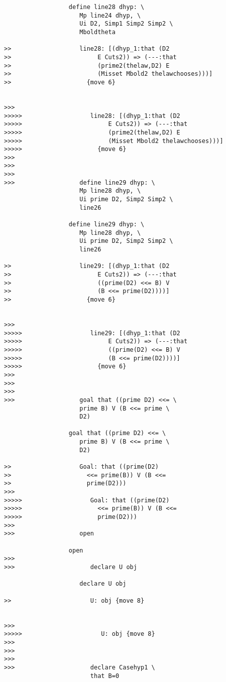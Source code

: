\documentclass[12pt]{article}
\begin{document}
\begin{verbatim}
                  define line28 dhyp: \
                     Mp line24 dhyp, \
                     Ui D2, Simp1 Simp2 Simp2 \
                     Mboldtheta

>>                   line28: [(dhyp_1:that (D2
>>                        E Cuts2)) => (---:that
>>                        (prime2(thelaw,D2) E
>>                        (Misset Mbold2 thelawchooses)))]
>>                     {move 6}


>>>
>>>>>                   line28: [(dhyp_1:that (D2
>>>>>                        E Cuts2)) => (---:that
>>>>>                        (prime2(thelaw,D2) E
>>>>>                        (Misset Mbold2 thelawchooses)))]
>>>>>                     {move 6}
>>>
>>>
>>>
>>>                  define line29 dhyp: \
                     Mp line28 dhyp, \
                     Ui prime D2, Simp2 Simp2 \
                     line26

                  define line29 dhyp: \
                     Mp line28 dhyp, \
                     Ui prime D2, Simp2 Simp2 \
                     line26

>>                   line29: [(dhyp_1:that (D2
>>                        E Cuts2)) => (---:that
>>                        ((prime(D2) <<= B) V
>>                        (B <<= prime(D2))))]
>>                     {move 6}


>>>
>>>>>                   line29: [(dhyp_1:that (D2
>>>>>                        E Cuts2)) => (---:that
>>>>>                        ((prime(D2) <<= B) V
>>>>>                        (B <<= prime(D2))))]
>>>>>                     {move 6}
>>>
>>>
>>>
>>>                  goal that ((prime D2) <<= \
                     prime B) V (B <<= prime \
                     D2)

                  goal that ((prime D2) <<= \
                     prime B) V (B <<= prime \
                     D2)

>>                   Goal: that ((prime(D2)
>>                     <<= prime(B)) V (B <<=
>>                     prime(D2)))
>>>
>>>>>                   Goal: that ((prime(D2)
>>>>>                     <<= prime(B)) V (B <<=
>>>>>                     prime(D2)))
>>>
>>>                  open

                  open
>>>
>>>                     declare U obj

                     declare U obj

>>                      U: obj {move 8}


>>>
>>>>>                      U: obj {move 8}
>>>
>>>
>>>
>>>                     declare Casehyp1 \
                        that B=0


\end{verbatim}
\end{document}
